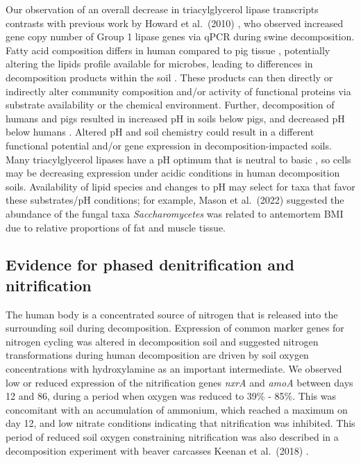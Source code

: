 \documentclass[
  sn-nature,
  lineno, referee]{sn-jnl}
\begin{document}
Our observation of an overall decrease in triacylglycerol lipase
transcripts contrasts with previous work by Howard et al.~(2010)
\citep{howard_characterization_2010}, who observed increased gene copy
number of Group 1 lipase genes via qPCR during swine decomposition.
Fatty acid composition differs in human compared to pig tissue
\citep{notter_initial_2009}, potentially altering the lipids profile
available for microbes, leading to differences in decomposition products
within the soil \citep{debruyn_comparative_2021}. These products can
then directly or indirectly alter community composition and/or activity
of functional proteins via substrate availability or the chemical
environment. Further, decomposition of humans and pigs resulted in
increased pH in soils below pigs, and decreased pH below humans
\citep{debruyn_comparative_2021}. Altered pH and soil chemistry could
result in a different functional potential and/or gene expression in
decomposition-impacted soils. Many triacylglycerol lipases have a pH
optimum that is neutral to basic
\citep{kok_characterization_1995, hasan_influence_2006, zouaoui_production_2012},
so cells may be decreasing expression under acidic conditions in human
decomposition soils. Availability of lipid species and changes to pH may
select for taxa that favor these substrates/pH conditions; for example,
Mason et al.~(2022) \citep{mason_body_2022} suggested the abundance of
the fungal taxa \emph{Saccharomycetes} was related to antemortem BMI due
to relative proportions of fat and muscle tissue.

\subsection{Evidence for phased denitrification and
nitrification}\label{evidence-for-phased-denitrification-and-nitrification}

The human body is a concentrated source of nitrogen that is released
into the surrounding soil during decomposition. Expression of common
marker genes for nitrogen cycling was altered in decomposition soil and
suggested nitrogen transformations during human decomposition are driven
by soil oxygen concentrations with hydroxylamine as an important
intermediate. We observed low or reduced expression of the nitrification
genes \emph{nxrA} and \emph{amoA} between days 12 and 86, during a
period when oxygen was reduced to 39\% - 85\%. This was concomitant with
an accumulation of ammonium, which reached a maximum on day 12, and low
nitrate conditions indicating that nitrification was inhibited. This
period of reduced soil oxygen constraining nitrification was also
described in a decomposition experiment with beaver carcasses Keenan et
al.~(2018) \citep{keenan_mortality_2018}.
\end{document}
